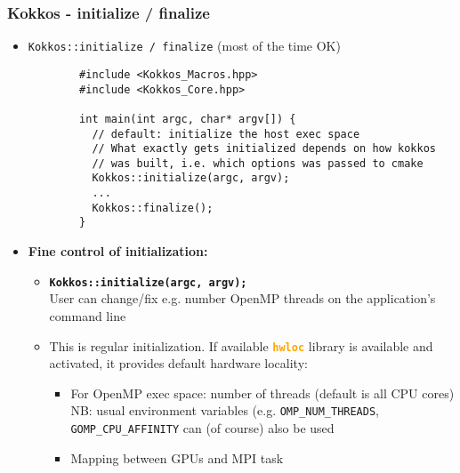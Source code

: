 \begin{frame}[fragile=singleslide]
  \frametitle{Kokkos - initialize / finalize}

  \begin{itemize}
  \item \texttt{Kokkos::initialize / finalize} (most of the time OK)
    {\small\begin{verbatim}
        #include <Kokkos_Macros.hpp>
        #include <Kokkos_Core.hpp>

        int main(int argc, char* argv[]) {
          // default: initialize the host exec space
          // What exactly gets initialized depends on how kokkos
          // was built, i.e. which options was passed to cmake
          Kokkos::initialize(argc, argv);
          ...
          Kokkos::finalize();
        }
      \end{verbatim}
    }
  \item \textbf{Fine control of initialization:}
    \begin{itemize}
    \item \texttt{\bf Kokkos::initialize(argc, argv);}\\
      User can change/fix e.g. number OpenMP threads on the application's command line
    \item This is regular initialization. If available \textcolor{orange}{\textbf{\texttt{hwloc}}} library is available and activated, it provides default hardware locality:
      \begin{itemize}
      \item For OpenMP exec space: number of threads (default is all CPU cores)\\
        NB: usual environment variables (e.g. \texttt{OMP\_NUM\_THREADS}, \texttt{GOMP\_CPU\_AFFINITY} can (of course) also be used
      \item Mapping between GPUs and MPI task
      \end{itemize}
    \end{itemize}
  \end{itemize}

\end{frame}



